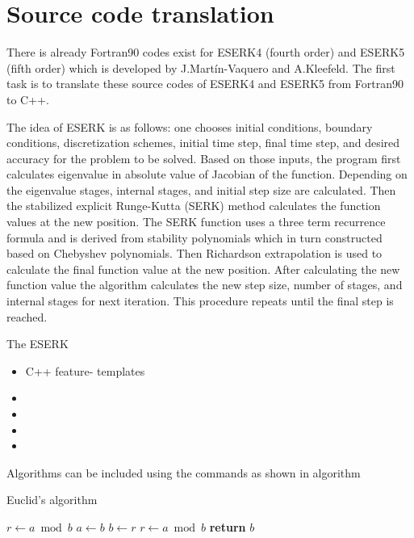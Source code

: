 \section{Source code translation}
There is already Fortran90 codes exist for ESERK4 (fourth order) and ESERK5 (fifth order)  which is developed by J.Mart\'{i}n-Vaquero and A.Kleefeld. 
The first task is to translate these source codes of ESERK4 and ESERK5 from Fortran90 to C++. 

The idea of ESERK is as follows: one chooses initial conditions, boundary conditions, discretization schemes, initial time step, final time step, and desired accuracy for the problem to be solved. Based on those inputs, the program first calculates eigenvalue in absolute value of Jacobian of the function. Depending on the eigenvalue stages, internal stages, and initial step size are calculated. Then the stabilized explicit Runge-Kutta (SERK) method calculates the function values at the new position. The SERK function uses a three term recurrence formula and is derived from stability polynomials which in turn constructed based on Chebyshev polynomials. Then Richardson extrapolation is used to calculate the final function value at the new position. After calculating the new function value the algorithm calculates the new step size, number of stages, and internal stages for next iteration. This procedure repeats until the final step is reached.  
               

The ESERK 


\begin{itemize}
	\item C++ feature- templates  
	\item 
	\item 
	\item 
	\item
\end{itemize}    


	
	Algorithms can be included using the commands as shown in algorithm 
	\begin{algorithm}
		\caption{Euclid’s algorithm}\label{alg:euclid}
		\begin{algorithmic}[1]
			\State $r\gets a\bmod b$
			\State $a\gets b$
			\State $b\gets r$
			\State $r\gets a\bmod b$
			\EndWhile\label{euclidendwhile}
			\State \textbf{return} $b$
			\EndProcedure
		\end{algorithmic}
	\end{algorithm}
